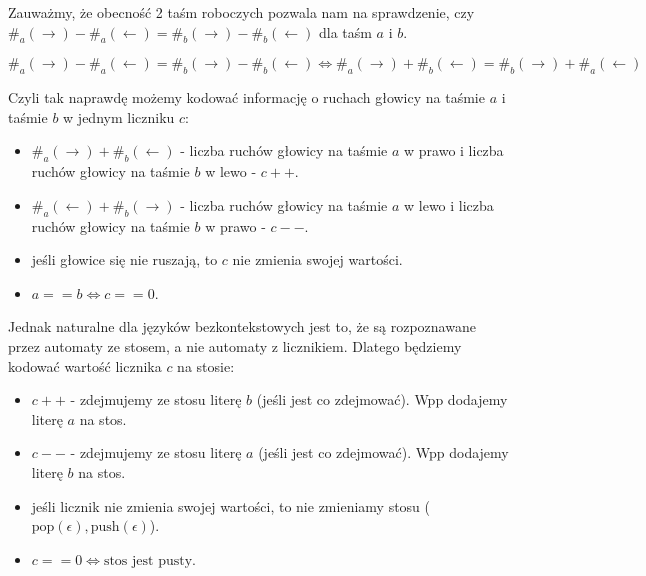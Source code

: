 \documentclass{article}
\theoremstyle{definition}
\theoremstyle{remark}
\begin{document}
Zauważmy, że obecność 2 taśm roboczych pozwala nam na sprawdzenie, czy 
\( \#_{a}(\rightarrow) - \#_{a}(\leftarrow) = \#_{b}(\rightarrow) -  \#_{b}(\leftarrow) \) dla taśm \(a\) i \(b\).

\[ \#_{a}(\rightarrow) - \#_{a}(\leftarrow) = \#_{b}(\rightarrow) -  \#_{b}(\leftarrow) \iff  \#_{a}(\rightarrow) + \#_{b}(\leftarrow) = \#_{b}(\rightarrow) + \#_{a}(\leftarrow) \]

Czyli tak naprawdę możemy kodować informację o ruchach głowicy na taśmie \(a\) i taśmie \(b\) w jednym liczniku \(c\):
\begin{itemize}
\item \( \#_{a}(\rightarrow) + \#_{b}(\leftarrow) \) - liczba ruchów głowicy na taśmie \(a\) w prawo i liczba ruchów głowicy na taśmie \(b\) w lewo - \(c++\).
\item \( \#_{a}(\leftarrow) + \#_{b}(\rightarrow) \) - liczba ruchów głowicy na taśmie \(a\) w lewo i liczba ruchów głowicy na taśmie \(b\) w prawo - \(c--\).
\item jeśli głowice się nie ruszają, to \(c\) nie zmienia swojej wartości.
\item \(a == b \iff c == 0\).
\end{itemize}

Jednak naturalne dla języków bezkontekstowych jest to, że są rozpoznawane przez automaty ze stosem, a nie automaty z licznikiem.
Dlatego będziemy kodować wartość licznika \(c\) na stosie:
\begin{itemize}
\item \(c++\) - zdejmujemy ze stosu literę \(b\) (jeśli jest co zdejmować). Wpp dodajemy literę \(a\) na stos.
\item \(c--\) - zdejmujemy ze stosu literę \(a\) (jeśli jest co zdejmować). Wpp dodajemy literę \(b\) na stos.
\item jeśli licznik nie zmienia swojej wartości, to nie zmieniamy stosu (\(\text{pop}(\epsilon), \text{push}(\epsilon)\)).
\item \(c == 0 \iff \text{stos jest pusty}\).
\end{itemize}
\end{document}

